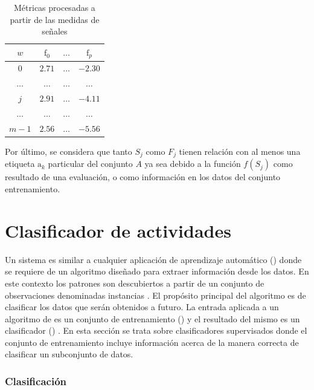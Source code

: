 \begin{table}[!tbph]
\begin{centering}
\begin{tabular}{|c|c|c|c|}
\hline 
$w$ & $\mathrm{f}_{0}$ & $\ldots$ & $\mathrm{f}_{p}$\tabularnewline
\hline 
\hline 
$0$ & $2.71$ & \texttt{$\ldots$} & \texttt{$-2.30$}\tabularnewline
\hline 
$\ldots$ & $\ldots$ & \texttt{$\ldots$} & \texttt{$\ldots$}\tabularnewline
\hline 
$j$ & $2.91$ & \texttt{$\ldots$} & \texttt{$-4.11$}\tabularnewline
\hline 
$\ldots$ & $\ldots$ & \texttt{$\ldots$} & \texttt{$\ldots$}\tabularnewline
\hline 
$m-1$ & $2.56$ & \texttt{$\ldots$} & \texttt{$-5.56$}\tabularnewline
\hline 
\end{tabular}
\par\end{centering}
\caption[Métricas de proceso de extracción]{\label{tab4:features}Métricas procesadas a partir de las medidas
de señales}
\end{table}

Por último, se considera que tanto $S_{j}$ como $F_{j\ensuremath{}}$
tienen relación con al menos una etiqueta $\mathrm{a}_{k}$ particular
del conjunto $A$ ya sea debido a la función $f(S_{j})$ como resultado
de una evaluación, o como información en los datos del conjunto entrenamiento.

\section{Clasificador de actividades }

\label{sec45:clasificador}Un sistema  es similar a cualquier
aplicación de aprendizaje automático () donde se requiere
de un algoritmo diseñado para extraer información desde los datos.
En este contexto los patrones son descubiertos a partir de un conjunto
de observaciones denominadas instancias \cite{LaraLabrador2013}.
El propósito principal del algoritmo es de clasificar los datos que
serán obtenidos a futuro. La entrada aplicada a un algoritmo de 
es un conjunto de entrenamiento () y el resultado
del mismo es un clasificador () \cite{Rajaraman2011}.
En esta sección se trata sobre clasificadores supervisados donde el
conjunto de entrenamiento incluye información acerca de la manera
correcta de clasificar un subconjunto de datos.

\subsubsection{Clasificación}

